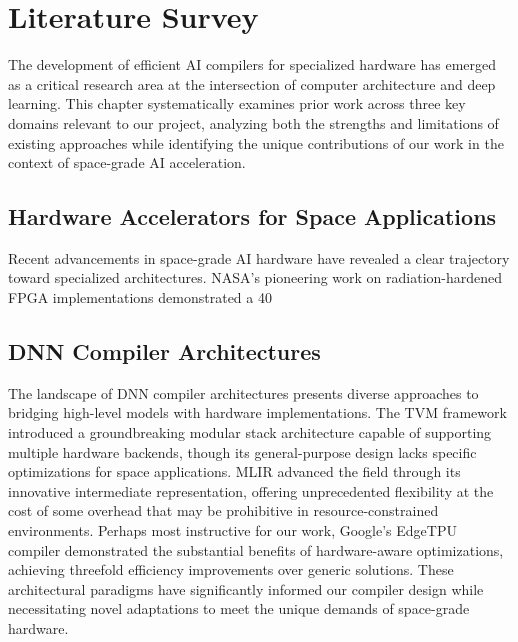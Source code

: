 \documentclass[12pt]{report}
\begin{document}
\chapter{Literature Survey}

The development of efficient AI compilers for specialized hardware has emerged as a critical research area at the intersection of computer architecture and deep learning. This chapter systematically examines prior work across three key domains relevant to our project, analyzing both the strengths and limitations of existing approaches while identifying the unique contributions of our work in the context of space-grade AI acceleration.

\section{Hardware Accelerators for Space Applications}
Recent advancements in space-grade AI hardware have revealed a clear trajectory toward specialized architectures. NASA's pioneering work on radiation-hardened FPGA implementations \cite{nasa2020} demonstrated a 40%

\section{DNN Compiler Architectures}
The landscape of DNN compiler architectures presents diverse approaches to bridging high-level models with hardware implementations. The TVM framework \cite{tvm2018} introduced a groundbreaking modular stack architecture capable of supporting multiple hardware backends, though its general-purpose design lacks specific optimizations for space applications. MLIR \cite{mlir2020} advanced the field through its innovative intermediate representation, offering unprecedented flexibility at the cost of some overhead that may be prohibitive in resource-constrained environments. Perhaps most instructive for our work, Google's EdgeTPU compiler \cite{googletpu2019} demonstrated the substantial benefits of hardware-aware optimizations, achieving threefold efficiency improvements over generic solutions. These architectural paradigms have significantly informed our compiler design while necessitating novel adaptations to meet the unique demands of space-grade hardware.
\end{document}
